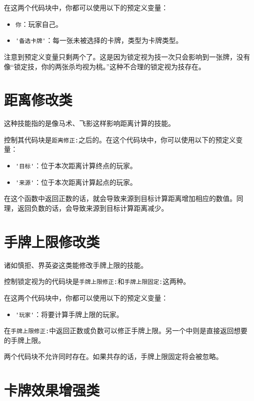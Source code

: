 在这两个代码块中，你都可以使用以下的预定义变量：

\begin{itemize}
 \item \verb|你|：玩家自己。
 \item \verb|'备选卡牌'|：每一张未被选择的卡牌，类型为卡牌类型。
\end{itemize}

注意到预定义变量只剩两个了。这是因为锁定视为技一次只会影响到一张牌，没有像“锁定技，你的两张杀均视为桃。”这种不合理的锁定视为技存在。

\section{距离修改类}

这种技能指的是像马术、飞影这样影响距离计算的技能。

控制其代码块是\verb|距离修正:|之后的。在这个代码块中，你可以使用以下的预定义变量：

\begin{itemize}
 \item \verb|'目标'|：位于本次距离计算终点的玩家。
 \item \verb|'来源'|：位于本次距离计算起点的玩家。
\end{itemize}

在这个函数中返回正数的话，就会导致来源到目标计算距离增加相应的数值。同理，返回负数的话，会导致来源到目标计算距离减少。

\section{手牌上限修改类}

诸如慎拒、界英姿这类能修改手牌上限的技能。

控制锁定视为的代码块是\verb|手牌上限修正:|和\verb|手牌上限固定:|这两种。

在这两个代码块中，你都可以使用以下的预定义变量：

\begin{itemize}
 \item \verb|'玩家'|：将要计算手牌上限的玩家。
\end{itemize}

在\verb|手牌上限修正:|中返回正数或负数可以修正手牌上限。另一个中则是直接返回想要的手牌上限。

两个代码块不允许同时存在。如果共存的话，手牌上限固定将会被忽略。

\section{卡牌效果增强类}

